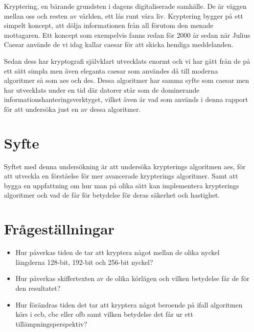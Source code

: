 Kryptering, en bärande grundsten i dagens digitaliserade samhälle. De är väggen mellan oss och resten
av världen, ett lås runt våra liv. Kryptering bygger på ett simpelt koncept, att dölja informationen
från all förutom den menade mottagaren. Ett koncept som exempelvis fanns redan för 2000 år sedan när Julius
Caesar använde de vi idag kallar \gls{caesar} för att skicka hemliga meddelanden.

Sedan dess har kryptografi självklart utvecklats enormt och vi har gått från de på ett sätt simpla men
även eleganta \gls{caesar} som användes då till moderna algoritmer så som \acrlong{aes} och \acrlong{des}.
Dessa algoritmer har samma syfte som \gls{caesar} men har utvecklats under en tid där datorer står som
de dominerande informationshanteringsverktyget, vilket även är vad som används i denna rapport för att
undersöka just en av dessa algoritmer.

\section{Syfte} %
Syftet med denna undersökning är att undersöka krypterings algoritmen \acrshort{aes},
för att utveckla en förståelse för mer avancerade krypterings algoritmer.
Samt att bygga en uppfattning om hur man på olika sätt kan implementera
krypterings algoritmer och vad de får för betydelse för deras säkerhet och
hastighet.

\section{Frågeställningar} %
\begin{itemize}
    \setlength{\itemindent}{-1em}
    \item Hur påverkas tiden de tar att kryptera något mellan de olika nyckel längderna 128-bit,
          192-bit och 256-bit nyckel?

    \item Hur påverkas skiffertexten av de olika körlägen och vilken betydelse får de för den resultatet?

    \item Hur förändras tiden det tar att kryptera något beroende på ifall algoritmen körs i
          \acrshort{ecb}, \acrshort{cbc} eller \acrshort{ofb} samt vilken betydelse det får ur ett
          tillämpningsperspektiv?
\end{itemize}

